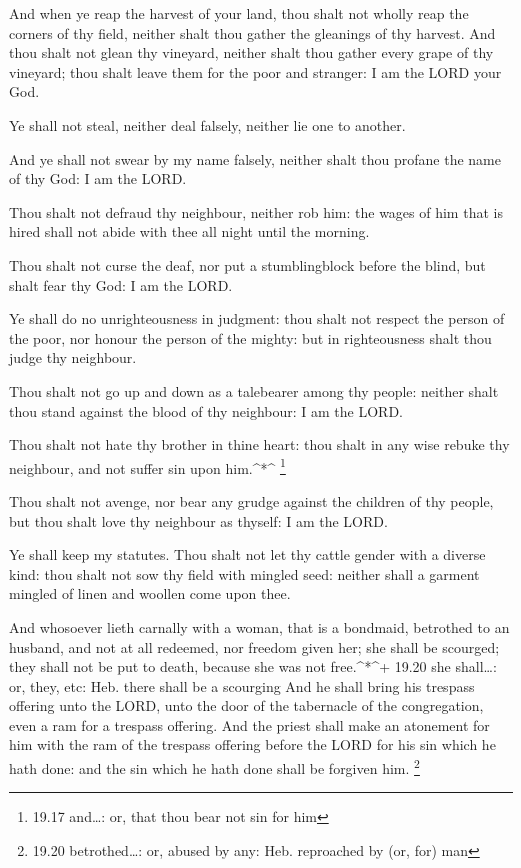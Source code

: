  And when ye reap the harvest of your land, thou shalt not
wholly reap the corners of thy field, neither shalt thou gather the
gleanings of thy harvest.  And thou shalt not glean thy
vineyard, neither shalt thou gather every grape of thy vineyard; thou
shalt leave them for the poor and stranger: I am the LORD your God.

 Ye shall not steal, neither deal falsely, neither lie one
to another.

 And ye shall not swear by my name falsely, neither shalt
thou profane the name of thy God: I am the LORD.

 Thou shalt not defraud thy neighbour, neither rob him: the
wages of him that is hired shall not abide with thee all night until the
morning.

 Thou shalt not curse the deaf, nor put a stumblingblock
before the blind, but shalt fear thy God: I am the LORD.

 Ye shall do no unrighteousness in judgment: thou shalt not
respect the person of the poor, nor honour the person of the mighty: but
in righteousness shalt thou judge thy neighbour.

 Thou shalt not go up and down as a talebearer among thy
people: neither shalt thou stand against the blood of thy neighbour: I
am the LORD.

 Thou shalt not hate thy brother in thine heart: thou shalt
in any wise rebuke thy neighbour, and not suffer sin upon him.\^{}*\^{}
\footnote{19.17 and\ldots: or, that thou bear not sin for him}

 Thou shalt not avenge, nor bear any grudge against the
children of thy people, but thou shalt love thy neighbour as thyself: I
am the LORD.

 Ye shall keep my statutes. Thou shalt not let thy cattle
gender with a diverse kind: thou shalt not sow thy field with mingled
seed: neither shall a garment mingled of linen and woollen come upon
thee.

 And whosoever lieth carnally with a woman, that is a
bondmaid, betrothed to an husband, and not at all redeemed, nor freedom
given her; she shall be scourged; they shall not be put to death,
because she was not free.\^{}*\^{}+ 19.20 she shall\ldots: or, they,
etc: Heb. there shall be a scourging  And he shall bring
his trespass offering unto the LORD, unto the door of the tabernacle of
the congregation, even a ram for a trespass offering.  And
the priest shall make an atonement for him with the ram of the trespass
offering before the LORD for his sin which he hath done: and the sin
which he hath done shall be forgiven him. \footnote{19.20
  betrothed\ldots: or, abused by any: Heb. reproached by (or, for) man}

